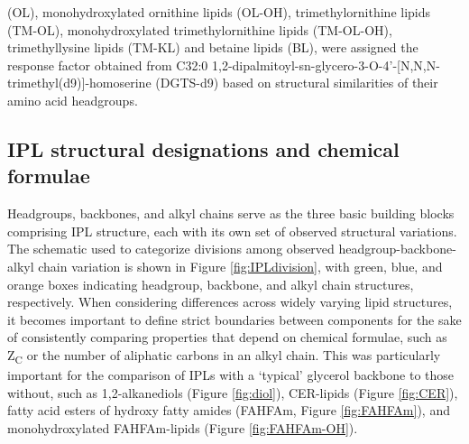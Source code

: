 (OL), monohydroxylated ornithine lipids (OL-OH), trimethylornithine lipids (TM-OL), monohydroxylated trimethylornithine lipids (TM-OL-OH), trimethyllysine lipids (TM-KL) and betaine lipids (BL), were assigned the response factor obtained from C32:0 1,2-dipalmitoyl-sn-glycero-3-O-4'-[N,N,N-trimethyl(d9)]-homoserine (DGTS-d9) based on structural similarities of their amino acid headgroups.




\subsection{IPL structural designations and chemical formulae} Headgroups, backbones, and alkyl chains serve as the three basic building blocks comprising IPL structure, each with its own set of observed structural variations. The schematic used to categorize divisions among observed headgroup-backbone-alkyl chain variation is shown in Figure \ref{fig:IPLdivision}, with green, blue, and orange boxes indicating headgroup, backbone, and alkyl chain structures, respectively. When considering differences across widely varying lipid structures, it becomes important to define strict boundaries between components for the sake of consistently comparing properties that depend on chemical formulae, such as Z\textsubscript{C} or the number of aliphatic carbons in an alkyl chain. This was particularly important for the comparison of IPLs with a `typical' glycerol backbone to those without, such as 1,2-alkanediols (Figure \ref{fig:diol}), CER-lipids (Figure \ref{fig:CER}), fatty acid esters of hydroxy fatty amides (FAHFAm, Figure \ref{fig:FAHFAm}), and monohydroxylated FAHFAm-lipids (Figure \ref{fig:FAHFAm-OH}).


